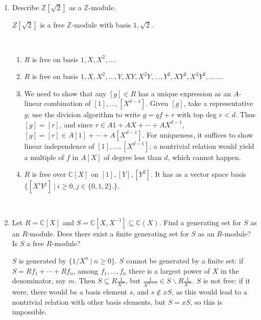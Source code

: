 \documentclass[12pt]{amsart}
\newcommand{\Bold}[1]{\contour{black}{#1}}
\newcommand{\Z}{\mathbb{Z}}
\newcommand{\C}{\mathbb{C}}
\newcommand{\solution}[1]{\ifthenelse {\equal{\displaysol}{1}} {\begin{framed}{\color{meretale}\noindent #1}\end{framed}} { \ }}
\newcommand\itemA{\stepcounter{enumi}\item[{\Bold{(\theenumi)}}]}
\newcommand\itema{\stepcounter{enumii}\item[{\Bold{(\theenumii)}}]}
\begin{document}
\begin{enumerate}
\

\itemA Describe $\Z[\sqrt{2}]$ as a $\Z$-module.

\solution{$Z[\sqrt{2}]$ is a free $\Z$-module with basis $1,\sqrt{2}$.}

\solution{
\begin{enumerate}
\itema $R$ is free on basis $1, X, X^2, \dots$.
\itema $R$ is free on basis $1, X, X^2, \dots, Y, XY, X^2Y, \dots, Y^2, XY^2, X^2Y^2, \dots \dots$.
\itema We need to show that any $[g] \in R$ has a unique expression as an $A$-linear combination of $[1],\dots,[X^{d-1}]$. Given $[g]$, take a representative $g$; use the division algorithm to write $g=qf+r$ with top deg $r<d$. Thus $[g] = [r]$, and since $r\in A 1 + A X + \cdots + A X^{d-1}$, $[g]=[r] \in A[1] + \cdots+ A[X^{d-1}]$. For uniqueness, it suffices to show linear independence of $[1],\dots,[X^{d-1}]$; a nontrivial relation would yield a multiple of $f$ in $A[X]$ of degree less than $d$, which cannot happen.
\itema $R$ is free over $\C[X]$ on $[1], [Y], [Y^2]$. It has as a vector space basis ${\{ [X^i Y^j] \ | \ i\geq 0, j\in\{0,1,2\}.\}}$.
\end{enumerate}}

\itemA Let $R=\C[X]$ and $S=\C[X,X^{-1}] \subseteq \C(X)$. Find a generating set for $S$ as an $R$-module. Does there exist a finite generating set for $S$ as an $R$-module? Is $S$ a free $R$-module?

\solution{$S$ is generated by $\{ 1/X^n \ | \ n\geq 0\}$. $S$ cannot be generated by a finite set: if ${S=R f_1 + \cdots + Rf_n}$, among $f_1,\dots,f_n$ there is a largest power of $X$ in the denominator, say $m$. Then $S\subseteq R \frac{1}{X^m}$, but $\frac{1}{X^{m+1}}\in S \smallsetminus R \frac{1}{X^m}$. $S$ is not free: if it were, there would be a basis element $s$, and $s\notin xS$, as this would lead to a nontrivial relation with other basis elements, but $S=xS$, so this is impossible.}



\end{enumerate}
\end{document}
